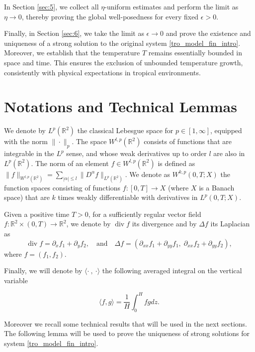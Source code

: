 \documentclass[11pt, a4paper, article,reqno,]{amsart}
\theoremstyle{remark}
\numberwithin{equation}{section}
\begin{document}
In Section \ref{sec:5}, we collect all $\eta$-uniform estimates and perform the limit as $\eta \to 0$, thereby proving the global well-posedness for every fixed $\epsilon>0$.

Finally, in Section \ref{sec:6}, we take the limit as $\epsilon \to 0$ and prove the existence and uniqueness of a strong solution to the original system \eqref{tro_model_fin_intro}. Moreover, we establish that the temperature $T$ remains essentially bounded in space and time. This ensures the exclusion of unbounded temperature growth, consistently with physical expectations in tropical environments.






\section{Notations and Technical Lemmas}\label{sec:2}
We denote by \( L^p(\mathbb{R}^2) \) the classical Lebesgue space for \( p \in [1, \infty] \), equipped with the norm \( \|\cdot\|_p \). The space \( W^{l,p}(\mathbb{R}^2) \) consists of functions that are integrable in the \( L^p \) sense, and whose weak derivatives up to order \( l \) are also in \( L^p(\mathbb{R}^2) \). The norm of an element \( f \in W^{l,p}(\mathbb{R}^2) \) is defined as $\|f\|_{W^{l,p}(\mathbb{R}^2)} = \sum_{|\alpha| \leq l} \| D^{\alpha}f \|_{L^{p}(\mathbb{R}^2)}$. We denote as \( W^{k,p}(0,T;X) \) the function spaces consisting of functions \( f: [0,T] \to X \) (where \( X \) is a Banach space) that are \( k \) times weakly differentiable with derivatives in \( L^p(0,T;X) \). 

Given a positive time $T>0$, for a sufficiently regular vector field \( f : \mathbb{R}^2 \times (0, T) \to \mathbb{R}^2 \), we denote by \( \operatorname{div} f \) its divergence and by \( \Delta f \) its Laplacian as
\begin{equation*}
  \operatorname{div} f = \partial_x f_1 + \partial_y f_2, \quad \text{and} \quad \Delta f = (\partial_{xx} f_1 + \partial_{yy} f_1, \; \partial_{xx} f_2 + \partial_{yy} f_2), 
\end{equation*}
where \( f = (f_1, f_2) \).

Finally, we will denote by $\langle \cdot \ , \ \cdot\rangle$ the following averaged integral on the vertical variable

$$\langle f, g\rangle = \frac{1}{H}\int_{0}^{H}fgdz.$$

Moreover  we recall some technical results that will be used in the next sections. The following lemma will be used to prove the uniqueness of strong solutions for system \eqref{tro_model_fin_intro}.
\end{document}
